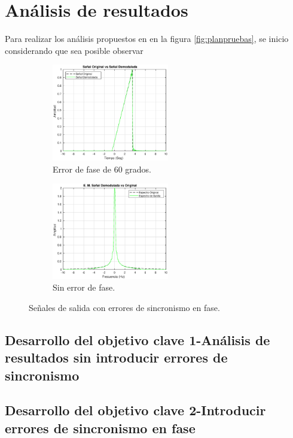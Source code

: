 \section{Análisis de resultados}%
\label{sec:analisisResultado}

Para realizar los análisis propuestos en en la figura \ref{fig:planpruebas}, se inicio considerando que sea posible observar

\begin{figure}[H]
	\centering
	\begin{subfigure}[b]{0.495\linewidth}
		\includegraphics[width=5.1cm]{img/Comp_Tim/Comp_Tim.eps}
		\caption{\scriptsize Error de fase de 60 grados.}
		\label{subfig:inoutTiempo}
	\end{subfigure}
	\begin{subfigure}[b]{0.495\linewidth}
		\includegraphics[width=5.1cm]{img/Comp_EM/Comp_EM.eps}
		\caption{\scriptsize Sin error de fase.}
		\label{subfig:inoutFrecuencia0}
	\end{subfigure}
	\vspace{-3mm}
	\caption{\scriptsize Señales de salida con errores de sincronismo en fase.}
	\label{fig:inoutSistema}
	\vspace{-5mm}
\end{figure}

\subsection{Desarrollo del objetivo clave 1-Análisis de resultados sin introducir errores de sincronismo}

\subsection{Desarrollo del objetivo clave 2-Introducir errores de sincronismo en fase}

